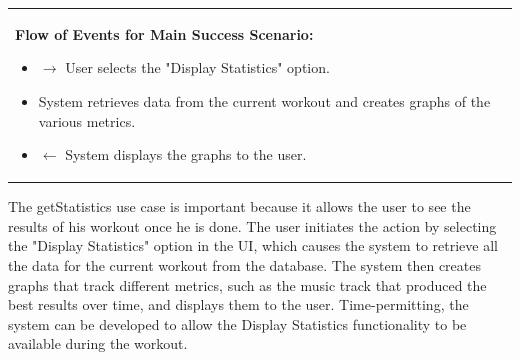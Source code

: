 \documentclass[letterpaper,english, 12pt]{scrreprt}
\begin{document}
\begin{center}
\begin{tabular}{|C{15cm}|}
                        \begin{flushleft}
                                \textbf{Flow of Events for Main Success Scenario: }
                        \end{flushleft}
                                \begin{itemize}
                                        \item $\rightarrow$ User selects the "Display Statistics" option.
                                        \item System retrieves data from the current workout and creates graphs of the various metrics.
                                        \item $\leftarrow$ System displays the graphs to the user.
                                \end{itemize}
                \hline
        \end{tabular}
\end{center}

The getStatistics use case is important because it allows the user to see the results of his workout once he is done. The user initiates the action by selecting the "Display Statistics" option in the UI, which causes the system to retrieve all the data for the current workout from the database. The system then creates graphs that track different metrics, such as the music track that produced the best results over time, and displays them to the user. Time-permitting, the system can be developed to allow the Display Statistics functionality to be available during the workout.
\end{document}
